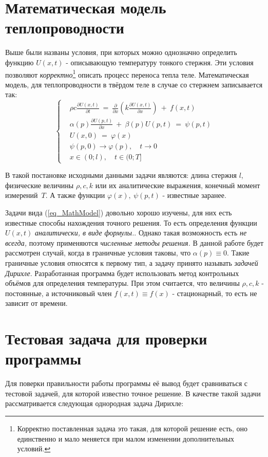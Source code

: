 \documentclass[oneside, final, 14pt]{report}
\begin{document}
\section{Математическая модель теплопроводности}
Выше были названы условия, при которых можно однозначно определить функцию $U(x, t)$ - описывающую температуру тонкого стержня. Эти условия позволяют \emph{корректно}\footnote{Корректно поставленная задача это такая, для которой решение есть, оно единственно и мало меняется при малом изменении дополнительных условий.} описать процесс переноса тепла теле. Математическая модель, для теплопроводности в твёрдом теле в случае со стержнем записывается так: 
\begin{equation}
\left\{\begin{aligned} 
& \rho c\frac{\partial U(x, t)}{\partial t} 
\ = \
\frac{\partial}{\partial x}(k\frac{\partial U(x, t)}{\partial x}) \ + \ f(x, t) \\
& \alpha(p)\frac{\partial U(p,t)}{\partial x} \ + \ \beta(p)U(p, t) \ = \ \psi(p, t)  \\
& U(x, 0) \ = \ \varphi(x) \\
& \psi(p, 0) \rightarrow \varphi(p), \quad t \rightarrow 0 \\
& x \in ( 0; l ), \quad t \in ( 0; T ]  
\end{aligned}\right. \label{eq_MathModel} 
\end{equation}


В такой постановке исходными данными задачи являются: длина стержня $l$, физические величины $\rho, c, k$ или их аналитические выражения, конечный момент измерений~$T$. А также функции $\varphi(x), \ \psi(p, t)$ - известные заранее.


Задачи вида (\ref{eq_MathModel}) довольно хорошо изучены, для них есть известные способы нахождения точного решения. То есть определения функции $U(x,t)$ \emph{аналитически, в виде формулы.}. Однако такая возможность есть \emph{не всегда,} поэтому применяются \emph{численные методы решения.} В данной работе будет рассмотрен случай, когда в граничные условия таковы, что $\alpha(p) \equiv 0 $. Такие граничные условия относятся к первому тип, а задачу принято называть \emph{задачей Дирихле}. Разработанная программа будет использовать метод контрольных объёмов для определения температуры. При этом считается, что величины $\rho, c, k$ - постоянные, а источниковый член $f(x, t) \equiv f(x)$ - стационарный, то есть не зависит от времени.


\section{Тестовая задача для проверки программы} 
\label{test_task_page}
Для поверки правильности работы программы её вывод будет сравниваться с тестовой задачей, для которой известно точное решение. В качестве такой задачи рассматривается следующая однородная задача Дирихле: 
\end{document}
